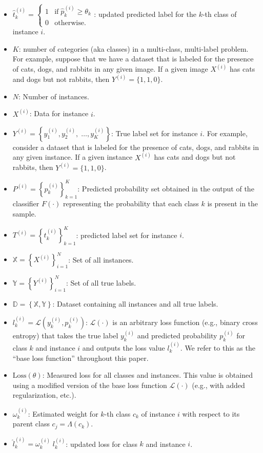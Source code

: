\documentclass[review,1p,times,numbers]{elsarticle}
\begin{document}
\begin{itemize}
    \item  $\widehat{t}_k^{(i)}=\left\{\begin{array}{ll}1&\text{if}\;\widehat{p}_k^{(i)}\geq\theta_k\\0&\text{otherwise.}\end{array}\right. $: updated predicted label for the $k $-th class of instance $i $.
    \item $K $: number of categories (aka classes) in a multi-class, multi-label problem. For example, suppose that we have a dataset that is labeled for the presence of cats, dogs, and rabbits in any given image. If a given image $X^{(i)} $ has cats and dogs but not rabbits, then $Y^{(i)} = \{1,1,0\} $.
    \item $N $: Number of instances.
    \item $X^{(i)} $: Data for instance $i$.
    \item $Y^{(i)}=\left\{y_1^{(i)},y_2^{(i)},\;\dots,y_{K}^{(i)}\right\} $: True label set for instance $i $. For example, consider a dataset that is labeled for the presence of cats, dogs, and rabbits in any given instance. If a given instance $X^{(i)} $ has cats and dogs but not rabbits, then $Y^{(i)}=\{1,1,0\} $.
    \item $P^{(i)} = {\left\{ p_k^{(i)} \right\}}_{k=1}^{K} $: Predicted probability set obtained in the output of the classifier $F(\cdot) $ representing the probability that each class $k $ is present in the sample.
    \item $T^{(i)} = {\left\{t_k^{(i)}\right\}}_{k=1}^{K} $: predicted label set for instance $i $.
    \item $\mathbb{X} = {\left\{X^{(i)}\right\}}_{i=1}^{N} $: Set of all instances.
    \item $\mathbb{Y} = {\left\{Y^{(i)}\right\}}_{i=1}^{N} $: Set of all true labels.
    \item $\mathbb{D}=\left\{\mathbb{X},\mathbb{Y}\right\} $: Dataset containing all instances and all true labels.
    \item $l_k^{(i)} = \mathcal{L} \left(y_k^{(i)},p_k^{(i)}\right) $:  $\mathcal{L}( \cdot) $ is an arbitrary loss function (e.g., binary cross entropy) that takes the true label $y_k^{(i)}$ and predicted probability $p_k^{(i)}$ for class $k$ and instance $i$ and outputs the loss value $l_k^{(i)} $. We refer to this as the ``base loss function'' throughout this paper.
    \item $\text{Loss}(\theta) $: Measured loss for all classes and instances. This value is obtained using a modified version of the base loss function $\mathcal{L}(\cdot) $ (e.g., with added regularization, etc.).
    \item $\omega_k^{(i)} $: Estimated weight for $k$-th class $c_k $ of instance $i $ with respect to its parent class $c_j=\Lambda (c_k) $.
    \item ${\widehat l}_k^{(i)} = \omega_k^{(i)} \; l_k^{(i)} $: updated loss for class $k $ and instance $i $.
\end{itemize}
\end{document}

